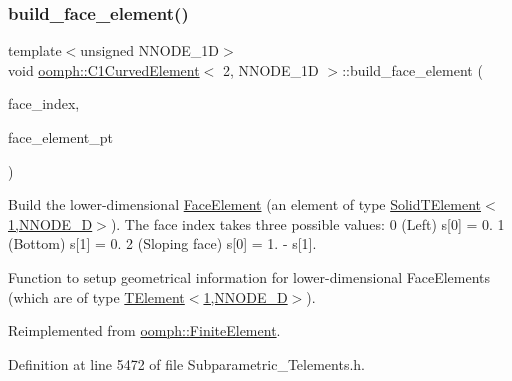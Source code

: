\subsubsection{\texorpdfstring{build\+\_\+face\+\_\+element()}{build\_face\_element()}}
{\footnotesize\ttfamily template$<$unsigned N\+N\+O\+D\+E\+\_\+1D$>$ \\
void \hyperlink{classoomph_1_1C1CurvedElement}{oomph\+::\+C1\+Curved\+Element}$<$ 2, N\+N\+O\+D\+E\+\_\+1D $>$\+::build\+\_\+face\+\_\+element (\begin{DoxyParamCaption}\item[{const int \&}]{face\+\_\+index,  }\item[{\hyperlink{classoomph_1_1FaceElement}{Face\+Element} $\ast$}]{face\+\_\+element\+\_\+pt }\end{DoxyParamCaption})\hspace{0.3cm}{\ttfamily [virtual]}}



Build the lower-\/dimensional \hyperlink{classoomph_1_1FaceElement}{Face\+Element} (an element of type \hyperlink{classoomph_1_1SolidTElement_3_011_00_01NNODE__1D_01_4}{Solid\+T\+Element$<$1,\+N\+N\+O\+D\+E\+\_\+D$>$}). The face index takes three possible values\+: 0 (Left) s\mbox{[}0\mbox{]} = 0. 1 (Bottom) s\mbox{[}1\mbox{]} = 0. 2 (Sloping face) s\mbox{[}0\mbox{]} = 1. -\/ s\mbox{[}1\mbox{]}. 

Function to setup geometrical information for lower-\/dimensional Face\+Elements (which are of type \hyperlink{classoomph_1_1TElement_3_011_00_01NNODE__1D_01_4}{T\+Element$<$1,\+N\+N\+O\+D\+E\+\_\+D$>$}). 

Reimplemented from \hyperlink{classoomph_1_1FiniteElement_aaf7bead5b462cfd5401d97b3dbdc7af7}{oomph\+::\+Finite\+Element}.



Definition at line 5472 of file Subparametric\+\_\+\+Telements.\+h.

\mbox{\label{classoomph_1_1C1CurvedElement_3_012_00_01NNODE__1D_01_4_ab7642a52d95f8b554f614b6fc5710a35}} 

